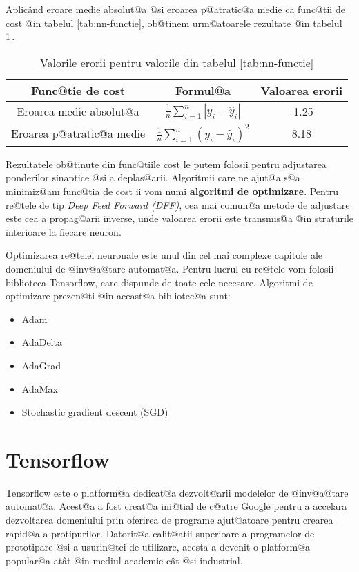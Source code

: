Aplic\^ and eroare medie absolut@a @si eroarea p@atratic@a medie ca func@tii de cost @in tabelul \ref{tab:nn-functie}, ob@tinem urm@atoarele rezultate @in tabelul \ref{tab:nn-erori}\,.

\begin{table}[h]
	\begin{center}
		\begin{tabular}{|c|c|c|}
			\hline
			Func@tie de cost & Formul@a & Valoarea erorii \\
			\hline
			Eroarea medie absolut@a & $\displaystyle\frac{1}{n} \sum_{i=1}^{n} |y_i - \hat{y}_i| $ & -1.25 \\
			\hline
			Eroarea p@atratic@a medie & $\displaystyle\frac{1}{n} \sum_{i=1}^{n} \left( y_i - \hat{y}_i \right)^2 $ & 8.18 \\
			\hline
		\end{tabular}
	\end{center}
	\caption{Valorile erorii pentru valorile din tabelul \ref{tab:nn-functie}}
	\label{tab:nn-erori}
\end{table}

Rezultatele ob@tinute din func@tiile cost le putem folosii pentru adjustarea ponderilor sinaptice @si a deplas@arii. Algoritmii care ne ajut@a s@a minimiz@am func@tia de cost ii vom numi \textbf{algoritmi de optimizare}. Pentru re@tele de tip \textsl{Deep Feed Forward (DFF)}, cea mai comun@a metode de adjustare este cea a propag@arii inverse, unde valoarea erorii este transmis@a @in straturile interioare la fiecare neuron. 

Optimizarea re@telei neuronale este unul din cel mai complexe capitole ale domeniului de @inv@a@tare automat@a. Pentru lucrul cu re@tele vom folosii biblioteca Tensorflow, care dispunde de toate cele necesare. Algoritmi de optimizare prezen@ti @in aceast@a bibliotec@a sunt:

\begin{itemize}
	\item Adam
	\item AdaDelta
	\item AdaGrad
	\item AdaMax
	\item Stochastic gradient descent (SGD)
\end{itemize} 

\section{Tensorflow}
Tensorflow este o platform@a dedicat@a dezvolt@arii modelelor de @inv@a@tare automat@a. Acest@a a fost creat@a ini@tial de c@atre Google pentru a accelara dezvoltarea domeniului prin oferirea de programe ajut@atoare pentru crearea rapid@a a protipurilor. Datorit@a calit@atii superioare a programelor de prototipare @si a usurin@tei de utilizare, acesta a devenit o platform@a popular@a at\^ at @in mediul academic c\^ at @si industrial.


